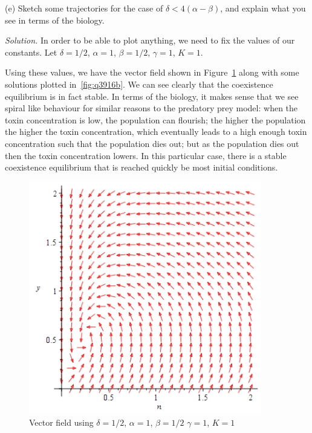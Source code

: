 \documentclass{article}
\begin{document}
\vspace{5mm}

(e) Sketch some trajectories for the case of $\delta < 4(\alpha - \beta)$,
and explain what you see in terms of the biology.

\textit{Solution.}
In order to be able to plot anything, we need to fix the values of our
constants. Let $\delta = 1 / 2$, $\alpha = 1$, $\beta = 1/2$,
$\gamma = 1$, $K = 1$.

Using these values, we have the vector field shown in
Figure~\ref{fig:q3916a} along with some solutions plotted
in~\ref{fig:q3916b}. We can see clearly that the coexistence equilibrium
is in fact stable. In terms of the biology, it makes sense that we see
spiral like behaviour for similar reasons to the predatory prey model:
when the toxin concentration is low, the population can flourish; the
higher the population the higher the toxin concentration, which
eventually leads to a high enough toxin concentration such that the
population dies out; but as the population dies out then the toxin
concentration lowers. In this particular case, there is a stable
coexistence equilibrium that is reached quickly be most initial
conditions.

\begin{figure}
    \includegraphics[width=4in]{q3916a}
    \centering
    \caption{Vector field using $\delta = 1 / 2$, $\alpha = 1$, $\beta = 1/2$ $\gamma = 1$, $K = 1$}
    \label{fig:q3916a}
\end{figure}
\end{document}
